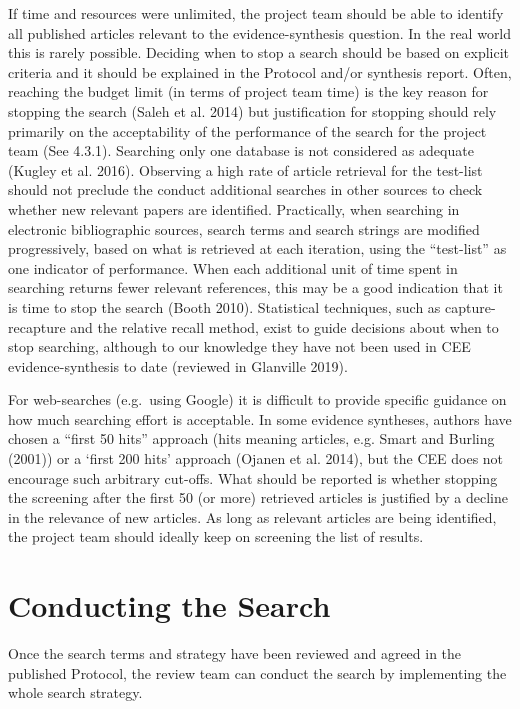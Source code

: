 \documentclass[
  letterpaper,
  DIV=11,
  numbers=noendperiod]{scrreprt}
\begin{document}
If time and resources were unlimited, the project team should be able to
identify all published articles relevant to the evidence-synthesis
question. In the real world this is rarely possible. Deciding when to
stop a search should be based on explicit criteria and it should be
explained in the Protocol and/or synthesis report. Often, reaching the
budget limit (in terms of project team time) is the key reason for
stopping the search (Saleh et al. 2014) but justification for stopping
should rely primarily on the acceptability of the performance of the
search for the project team (See 4.3.1). Searching only one database is
not considered as adequate (Kugley et al. 2016). Observing a high rate
of article retrieval for the test-list should not preclude the conduct
additional searches in other sources to check whether new relevant
papers are identified. Practically, when searching in electronic
bibliographic sources, search terms and search strings are modified
progressively, based on what is retrieved at each iteration, using the
``test-list'' as one indicator of performance. When each additional unit
of time spent in searching returns fewer relevant references, this may
be a good indication that it is time to stop the search (Booth 2010).
Statistical techniques, such as capture-recapture and the relative
recall method, exist to guide decisions about when to stop searching,
although to our knowledge they have not been used in CEE
evidence-synthesis to date (reviewed in Glanville 2019).

For web-searches (e.g.~using Google) it is difficult to provide specific
guidance on how much searching effort is acceptable. In some evidence
syntheses, authors have chosen a ``first 50 hits'' approach (hits
meaning articles, e.g. Smart and Burling (2001)) or a `first 200 hits'
approach (Ojanen et al. 2014), but the CEE does not encourage such
arbitrary cut-offs. What should be reported is whether stopping the
screening after the first 50 (or more) retrieved articles is justified
by a decline in the relevance of new articles. As long as relevant
articles are being identified, the project team should ideally keep on
screening the list of results.

\section{Conducting the Search}\label{conducting-the-search}

Once the search terms and strategy have been reviewed and agreed in the
published Protocol, the review team can conduct the search by
implementing the whole search strategy.
\end{document}
